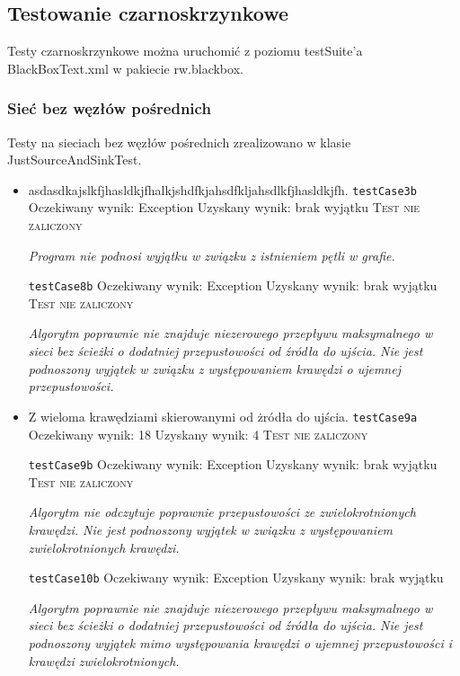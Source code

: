 \subsection{Testowanie czarno\dywiz skrzynkowe}

Testy czarnoskrzynkowe można uruchomić z poziomu testSuite'a BlackBoxText.xml
w pakiecie rw.blackbox.

\subsubsection{Sieć bez węzłów pośrednich}
Testy na sieciach bez węzłów pośrednich zrealizowano w klasie JustSourceAndSinkTest.
\begin{itemize}[nosep]

    \item asdasdkajslkfjhasldkjfhalkjshdfkjahsdfkljahsdlkfjhasldkjfh.
    \texttt{testCase3b}
    Oczekiwany wynik: Exception
    Uzyskany wynik: brak wyjątku
    \textsc{Test nie zaliczony}

    \emph{Program nie podnosi wyjątku w związku z istnieniem pętli w grafie.}

    \texttt{testCase8b}
    Oczekiwany wynik: Exception
    Uzyskany wynik: brak wyjątku
    \textsc{Test nie zaliczony}

    \emph{Algorytm poprawnie nie znajduje niezerowego przepływu maksymalnego w sieci
    bez ścieżki o dodatniej przepustowości od źródła do ujścia. Nie jest podnoszony
    wyjątek w związku z występowaniem krawędzi o ujemnej przepustowości.}

    \item Z wieloma krawędziami skierowanymi od żródła do ujścia.
    \texttt{testCase9a}
    Oczekiwany wynik: 18
    Uzyskany wynik: 4
    \textsc{Test nie zaliczony}

    \texttt{testCase9b}
    Oczekiwany wynik: Exception
    Uzyskany wynik: brak wyjątku
    \textsc{Test nie zaliczony}

    \emph{Algorytm nie odczytuje poprawnie przepustowości ze zwielokrotnionych
    krawędzi. Nie jest podnoszony wyjątek w związku z występowaniem
    zwielokrotnionych krawędzi.}

    \texttt{testCase10b}
    Oczekiwany wynik: Exception
    Uzyskany wynik: brak wyjątku

    \emph{Algorytm poprawnie nie znajduje niezerowego przepływu maksymalnego
    w sieci bez ścieżki o dodatniej przepustowości od źródła do ujścia.
    Nie jest podnoszony wyjątek mimo występowania krawędzi o ujemnej przepustowości
    i krawędzi zwielokrotnionych.}


\end{itemize}
